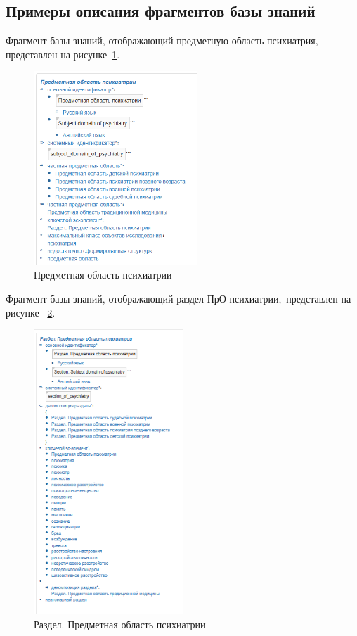 \subsection{Примеры описания фрагментов базы знаний}
Фрагмент базы знаний, отображающий предметную область психиатрия$,$ представлен на рисунке~\ref{fig:sections/subject_domain_of_psychiatry}.
\begin{figure}[H]
	\centering
	\includegraphics[width=0.55\textwidth]{sections/subject_domain_of_psychiatry.png}
	\caption{Предметная область психиатрии}
	\label{fig:sections/subject_domain_of_psychiatry}
\end{figure}

Фрагмент базы знаний, отображающий раздел ПрО психиатрии$,$ представлен на рисунке
~\ref{fig:sections/section_of_psychiatry}.
\begin{figure}[H]
	\centering
	\includegraphics[width=0.5\textwidth]{sections/section_of_psychiatry.png}
	\caption{Раздел. Предметная область психиатрии}
	\label{fig:sections/section_of_psychiatry}
\end{figure}

